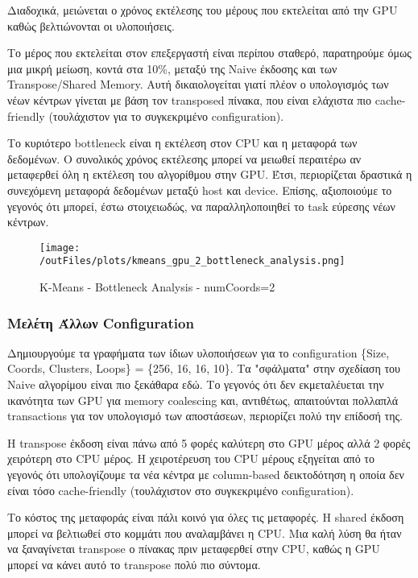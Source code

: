 \documentclass[../final_report.tex]{subfiles}
\begin{document}
Διαδοχικά, μειώνεται ο χρόνος εκτέλεσης του μέρους που εκτελείται από την GPU καθώς βελτιώνονται οι υλοποιήσεις.

Το μέρος που εκτελείται στον επεξεργαστή είναι περίπου σταθερό, παρατηρούμε όμως μια μικρή μείωση, κοντά στα 10\%,
μεταξύ της Naive έκδοσης και των Transpose/Shared Memory. Αυτή δικαιολογείται γιατί πλέον ο υπολογισμός των νέων κέντρων
γίνεται με βάση τον transposed πίνακα, που είναι ελάχιστα πιο cache-friendly (τουλάχιστον για το συγκεκριμένο configuration).

Το κυριότερο bottleneck είναι η εκτέλεση στον CPU και η μεταφορά των δεδομένων. Ο συνολικός χρόνος εκτέλεσης μπορεί να 
μειωθεί περαιτέρω αν μεταφερθεί όλη η εκτέλεση του αλγορίθμου στην GPU. Έτσι, περιορίζεται δραστικά η συνεχόμενη μεταφορά 
δεδομένων μεταξύ host και device. Επίσης, αξιοποιούμε το γεγονός ότι μπορεί, έστω στοιχειωδώς, να παραλληλοποιηθεί το task 
εύρεσης νέων κέντρων.

\begin{figure}[H]
    \centering
    \texttt{[image: /outFiles/plots/kmeans\_gpu\_2\_bottleneck\_analysis.png]}
    \caption{K-Means - Bottleneck Analysis - numCoords=2}
    \label{fig:K-Means - Bottleneck Analysis - numCoords=2}
\end{figure}

\subsubsection*{Μελέτη Άλλων Configuration}

Δημιουργούμε τα γραφήματα των ίδιων υλοποιήσεων για το configuration \{Size, Coords, Clusters, Loops\} = \{256, 16, 16, 10\}.
Τα "σφάλματα" στην σχεδίαση του Naive αλγορίμου είναι πιο ξεκάθαρα εδώ. Το γεγονός ότι δεν εκμεταλέυεται την ικανότητα των 
GPU για memory coalescing και, αντιθέτως, απαιτούνται πολλαπλά transactions για τον υπολογισμό των αποστάσεων, περιορίζει πολύ την
επίδοσή της. 

Η transpose έκδοση είναι πάνω από 5 φορές καλύτερη στο GPU μέρος αλλά 2 φορές χειρότερη στο CPU μέρος. Η χειροτέρευση 
του CPU μέρους εξηγείται από το γεγονός ότι υπολογίζουμε τα νέα κέντρα με column-based δεικτοδότηση η οποία δεν είναι τόσο 
cache-friendly (τουλάχιστον στο συγκεκριμένο configuration).

Το κόστος της μεταφοράς είναι πάλι κοινό για όλες τις μεταφορές. Η shared έκδοση μπορεί να βελτιωθεί στο κομμάτι που αναλαμβάνει η CPU.
Μια καλή λύση θα ήταν να ξαναγίνεται transpose ο πίνακας πριν μεταφερθεί στην CPU, καθώς η GPU μπορεί να κάνει αυτό το transpose πολύ πιο σύντομα.
\end{document}
